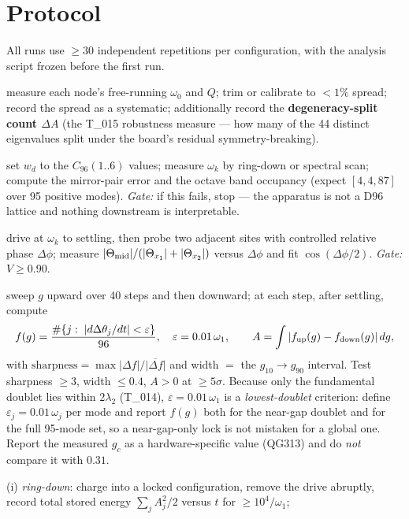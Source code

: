 \documentclass[11pt,a4paper]{article}
\newcommand{\ls}[1]{\ensuremath{\lambda_{#1}}}
\newcommand{\w}[1]{\ensuremath{\omega_{#1}}}
\newcommand{\Cninety}{\ensuremath{C_{96}(1..6)}}
\begin{document}
\section{Protocol}

All runs use $\ge30$ independent repetitions per configuration, with the analysis script frozen
before the first run.

\begin{description}[leftmargin=1.2em,style=nextline]
\item[R0 --- calibration] measure each node's free-running $\w{0}$ and $Q$; trim or calibrate to
$<1\%$ spread; record the spread as a systematic; additionally record the \textbf{degeneracy-split
count $\Delta A$} (the T\_015 robustness measure --- how many of the 44 distinct eigenvalues split
under the board's residual symmetry-breaking).
\item[R1 --- validity (H0)] set $w_d$ to the \Cninety{} values; measure $\w{k}$ by ring-down or
spectral scan; compute the mirror-pair error and the octave band occupancy (expect $[4,4,87]$ over
95 positive modes). \emph{Gate:} if this fails, stop --- the apparatus is not a D96 lattice and
nothing downstream is interpretable.
\item[R2 --- charging and read-out (H3)] drive at $\w{k}$ to settling, then probe two adjacent sites
with controlled relative phase $\Delta\phi$; measure
$|\Theta_{\rm mid}|/(|\Theta_{x_1}|+|\Theta_{x_2}|)$ versus $\Delta\phi$ and fit $\cos(\Delta\phi/2)$.
\emph{Gate:} $V\ge0.90$.
\item[R3 --- lock threshold and hysteresis (H1)] sweep $g$ upward over 40 steps and then downward;
at each step, after settling, compute
\[
f(g)=\frac{\#\{j:\;|d\Delta\theta_j/dt|<\varepsilon\}}{96},\quad \varepsilon=0.01\,\w{1},
\qquad
A=\int|f_{\rm up}(g)-f_{\rm down}(g)|\,dg ,
\]
with $\text{sharpness}=\max|\Delta f|/\overline{|\Delta f|}$ and width $=$ the $g_{10}\!\to\!g_{90}$
interval. Test sharpness $\ge3$, width $\le0.4$, $A>0$ at $\ge5\sigma$. Because only the fundamental
doublet lies within $2\ls{2}$ (T\_014), $\varepsilon=0.01\,\w{1}$ is a \emph{lowest-doublet}
criterion: define $\varepsilon_j=0.01\,\w{j}$ per mode and report $f(g)$ both for the near-gap
doublet and for the full 95-mode set, so a near-gap-only lock is not mistaken for a global one.
Report the measured $g_c$ as a hardware-specific value (QG313) and do \emph{not} compare it with
$0.31$.
\item[R4 --- retention (H2)] (i) \emph{ring-down}: charge into a locked configuration, remove the
drive abruptly, record total stored energy $\sum_j A_j^2/2$ versus $t$ for $\ge10^4/\w{1}$;

\end{description}
\end{document}
